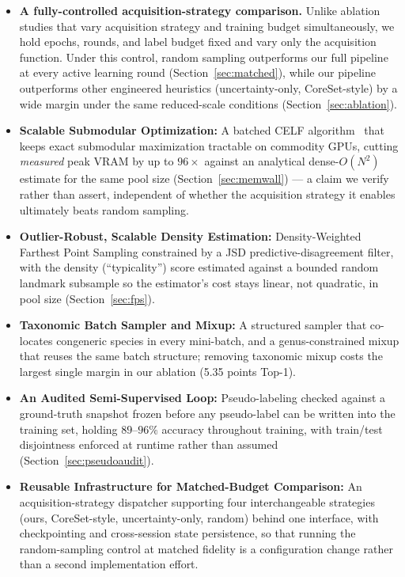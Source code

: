 \documentclass[conference]{IEEEtran}
\begin{document}
\begin{itemize}
\item \textbf{A fully-controlled acquisition-strategy comparison.} Unlike ablation studies that vary acquisition strategy and training budget simultaneously, we hold epochs, rounds, and label budget fixed and vary only the acquisition function. Under this control, random sampling outperforms our full pipeline at every active learning round (Section~\ref{sec:matched}), while our pipeline outperforms other engineered heuristics (uncertainty-only, CoreSet-style) by a wide margin under the same reduced-scale conditions (Section~\ref{sec:ablation}).
\item \textbf{Scalable Submodular Optimization:} A batched CELF algorithm~\cite{leskovec2007cost} that keeps exact submodular maximization tractable on commodity GPUs, cutting \emph{measured} peak VRAM by up to $96\times$ against an analytical dense-$O(N^2)$ estimate for the same pool size (Section~\ref{sec:memwall}) — a claim we verify rather than assert, independent of whether the acquisition strategy it enables ultimately beats random sampling.
\item \textbf{Outlier-Robust, Scalable Density Estimation:} Density-Weighted Farthest Point Sampling constrained by a JSD predictive-disagreement filter, with the density (``typicality'') score estimated against a bounded random landmark subsample so the estimator's cost stays linear, not quadratic, in pool size (Section~\ref{sec:fps}).
\item \textbf{Taxonomic Batch Sampler and Mixup:} A structured sampler that co-locates congeneric species in every mini-batch, and a genus-constrained mixup that reuses the same batch structure; removing taxonomic mixup costs the largest single margin in our ablation (5.35 points Top-1).
\item \textbf{An Audited Semi-Supervised Loop:} Pseudo-labeling checked against a ground-truth snapshot frozen before any pseudo-label can be written into the training set, holding $89$--$96\%$ accuracy throughout training, with train/test disjointness enforced at runtime rather than assumed (Section~\ref{sec:pseudoaudit}).
\item \textbf{Reusable Infrastructure for Matched-Budget Comparison:} An acquisition-strategy dispatcher supporting four interchangeable strategies (ours, CoreSet-style, uncertainty-only, random) behind one interface, with checkpointing and cross-session state persistence, so that running the random-sampling control at matched fidelity is a configuration change rather than a second implementation effort.
\end{itemize}
\end{document}
